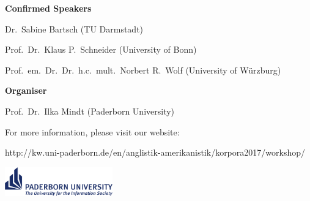 \documentclass[12pt]{article}
\begin{document}
\begin{titlepage}
{	{\fontsize{1.2cm}{0cm}\selectfont\textbf{Confirmed Speakers}\par}
	{\huge Dr.~Sabine Bartsch (TU Darmstadt)\par	
	Prof.~Dr.~Klaus P.~Schneider (University of Bonn)\par
	Prof.~em.~Dr.~Dr.~h.c.~mult.~Norbert R.~Wolf (University of W\"{u}rzburg)\par}
		\vfill
	{\huge\textbf{Organiser}\par}
	{\huge Prof.~Dr.~Ilka Mindt (Paderborn University)\par}
		\vfill
	{\huge For more information, please visit our website:\par}
	{\LARGE http://kw.uni-paderborn.de/en/anglistik-amerikanistik/korpora2017/workshop/\par}
	}
	
		\vspace{2cm}
		
		\mbox{\hspace{0.77\textwidth}\includegraphics[width=0.35\textwidth]{UPB_LOGO_GB_CMYK_15.pdf}}

\end{titlepage}
\end{document}
